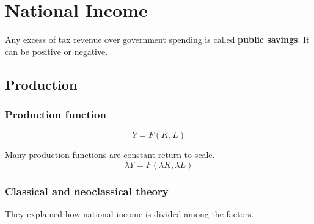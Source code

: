\documentclass[12pt]{article}
\begin{document}
\section{National Income}


\begin{figure}[H]
\end{figure}

Any excess of tax revenue over government spending is called {\textbf {public savings}}.
It can be positive or negative.


\subsection{Production}

\subsubsection{Production function}
\begin{equation*}
Y = F(K, L)
\end{equation*}

Many production functions are constant return to scale.
\begin{equation*}
\lambda Y = F(\lambda K, \lambda L)
\end{equation*}

\subsubsection{Classical and neoclassical theory}
They explained how national income is divided among the factors.
\end{document}
